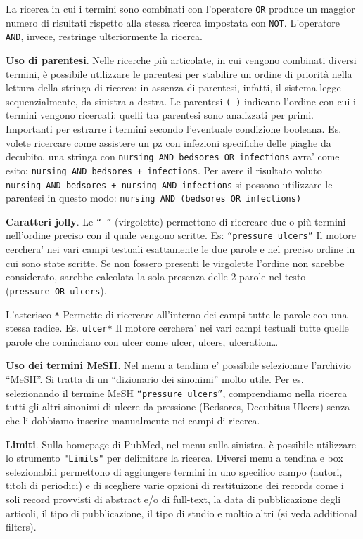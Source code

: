 \documentclass[]{book}
\begin{document}
La ricerca in cui i termini sono combinati con l'operatore \texttt{OR} produce un maggior numero di risultati rispetto alla stessa ricerca impostata con \texttt{NOT}. L'operatore \texttt{AND}, invece, restringe ulteriormente la ricerca.

\textbf{Uso di parentesi}. Nelle ricerche più articolate, in cui vengono combinati diversi termini, è possibile utilizzare le parentesi per stabilire un ordine di priorità nella lettura della stringa di ricerca: in assenza di parentesi, infatti, il sistema legge sequenzialmente, da sinistra a destra. Le parentesi \texttt{(\ )} indicano l'ordine con cui i termini vengono ricercati: quelli tra parentesi sono analizzati per primi. Importanti per estrarre i termini secondo l'eventuale condizione booleana. Es. volete ricercare come assistere un pz con infezioni specifiche delle piaghe da decubito, una stringa con \texttt{nursing\ AND\ bedsores\ OR\ infections} avra' come esito: \texttt{nursing\ AND\ bedsores\ +\ infections}. Per avere il risultato voluto \texttt{nursing\ AND\ bedsores\ +\ nursing\ AND\ infections} si possono utilizzare le parentesi in questo modo: \texttt{nursing\ AND\ (bedsores\ OR\ infections)}

\textbf{Caratteri jolly}. Le \texttt{“\ ”} (virgolette) permettono di ricercare due o più termini nell'ordine preciso con il quale vengono scritte. Es: \texttt{“pressure\ ulcers”} Il motore cerchera' nei vari campi testuali esattamente le due parole e nel preciso ordine in cui sono state scritte. Se non fossero presenti le virgolette l'ordine non sarebbe considerato, sarebbe calcolata la sola presenza delle 2 parole nel testo (\texttt{pressure\ OR\ ulcers}).

L'asterisco \texttt{*} Permette di ricercare all'interno dei campi tutte le parole con una stessa radice. Es. \texttt{ulcer*} Il motore cerchera' nei vari campi testuali tutte quelle parole che cominciano con ulcer come ulcer, ulcers, ulceration\ldots{}

\textbf{Uso dei termini MeSH}. Nel menu a tendina e' possibile selezionare l'archivio ``MeSH''. Si tratta di un ``dizionario dei sinonimi'' molto utile. Per es. selezionando il termine MeSH \texttt{“pressure\ ulcers”}, comprendiamo nella ricerca tutti gli altri sinonimi di ulcere da pressione (Bedsores, Decubitus Ulcers) senza che li dobbiamo inserire manualmente nei campi di ricerca.

\textbf{Limiti}. Sulla homepage di PubMed, nel menu sulla sinistra, è possibile utilizzare lo strumento \texttt{"Limits"} per delimitare la ricerca. Diversi menu a tendina e box selezionabili permettono di aggiungere termini in uno specifico campo (autori, titoli di periodici) e di scegliere varie opzioni di restituizone dei records come i soli record provvisti di abstract e/o di full-text, la data di pubblicazione degli articoli, il tipo di pubblicazione, il tipo di studio e moltio altri (si veda additional filters).
\end{document}
